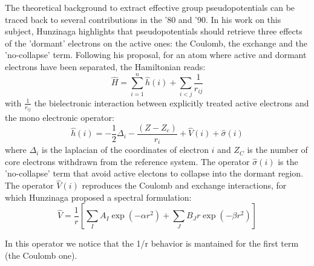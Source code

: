 \documentclass[journal=jctcce,manuscript=article]{achemso}
\begin{document}
The theoretical background to extract effective group pseudopotentials  can be traced back 
to several contributions in the '80 and '90. In his work on this subject, 
Hunzinaga highlights that pseudopotentials should retrieve three effects of the
'dormant' electrons on the active ones: the Coulomb, the exchange and the 'no-collapse' term.\cite{huzinaga_effective_1991}
Following his proposal, for an atom where active and dormant electrons have been separated, the Hamiltonian reads:
\begin{equation}
\label{eq:atomicHamiltonian}
\hat{H} = \sum_{i=1}^n \hat{h}(i) +\sum_{i<j}\frac{1}{r_{ij}}
\end{equation}
with $\frac{1}{r_{ij}}$ the bielectronic interaction
between explicitly treated active electrons and
the mono electronic operator:
\begin{equation}
\label{eq:monoElectronicOperator}
\hat{h}(i) = -\frac{1}{2}\Delta_i - \frac{(Z-Z_c)}{r_i}+\hat{V}(i) + \hat{\sigma}(i)
\end{equation}
where
$\Delta_i$ is the laplacian of the coordinates of electron $i$ and 
$Z_C$ is the number of core electrons withdrawn from the reference system.
The operator $\hat{\sigma}(i)$ is the 'no-collapse' term that avoid active electons
to collapse into the dormant region. The operator $\hat{V}(i)$ reproduces the 
Coulomb and exchange interactions, for which Hunzinaga proposed a spectral formulation:
\begin{equation}
\label{eq:HuzinagaMPVersion1Potential}
\hat{V} = \frac{1}{r}\left[\sum_IA_I\exp(-\alpha r^2)+\sum_JB_Jr\exp(-\beta r^2)\right]
\end{equation}

In this operator we notice that the 1/r behavior is mantained for the first term 
(the Coulomb one).
\end{document}
